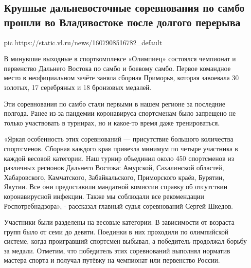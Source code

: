  
 
 
 
 
 
\subsection{Крупные дальневосточные соревнования по самбо прошли во Владивостоке после долгого перерыва}
\label{sec:14_12_2020.news.ru.vladivostok.2.sambo_vladivostok}


\ifcmt
pic https://static.vl.ru/news/1607908516782_default
\fi

В минувшие выходные в спорткомплексе «Олимпиец» состоялся чемпионат и
первенство Дальнего Востока по самбо и боевому самбо. Первое командное место в
неофициальном зачёте заняла сборная Приморья, которая завоевала 30 золотых, 17
серебряных и 18 бронзовых медалей.

Эти соревнования по самбо стали первыми в нашем регионе за последние полгода.
Ранее из-за пандемии коронавируса спортсменам было запрещено не только
участвовать в турнирах, но и какое-то время даже тренироваться.

«Яркая особенность этих соревнований — присутствие большого количества
спортсменов. Сборная каждого края привезла минимум по четыре участника в каждой
весовой категории. Наш турнир объединил около 450 спортсменов из различных
регионов Дальнего Востока: Амурской, Сахалинской областей, Хабаровского,
Камчатского, Забайкальского, Приморского краёв, Бурятии, Якутии. Все они
предоставили мандатной комиссии справку об отсутствии коронавирусной инфекции.
Также мы соблюдали все рекомендации Роспотребнадзора», - рассказал главный
судья соревнований Сергей Шкедов.

Участники были разделены на весовые категории. В зависимости от возраста групп
было от семи до девяти. Поединки в них проходили по олимпийской системе, когда
проигравший спортсмен выбывал, а победитель продолжал борьбу за медали.
Отметим, что победитель этих соревнований выполнял норматив мастера спорта и
получал путёвку на чемпионат или первенство России.

